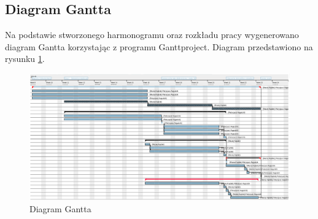 \documentclass[10pt, a4paper]{article}
\begin{document}
\newpage
\begin{landscape}
\subsection{Diagram Gantta}
Na podstawie stworzonego harmonogramu oraz rozkładu pracy wygenerowano diagram Gantta korzystając z programu Ganttproject.
Diagram przedstawiono na rysunku \ref{fig:Gantt}.


\begin{figure}[H]
	\centering
	\includegraphics[scale=0.6, keepaspectratio]{GanttSR.png}
	\caption{Diagram Gantta}
	\label{fig:Gantt}
\end{figure}
\end{landscape}


%


%
%


\newpage
\listoffigures
\newpage
\listoftables
\end{document}
